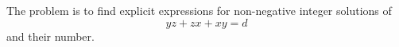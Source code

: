 \begin{proposition}
    The problem is to find explicit expressions for non-negative integer solutions of
\[
    yz+zx+xy=d
\]
    and their number.
\end{proposition}
